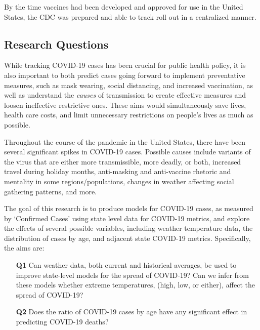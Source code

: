 \documentclass[11pt]{article}
\begin{document}
	By the time vaccines had been developed and approved for use in the United States, the CDC was prepared and able to track roll out in a centralized manner. 
	

\subsection{Research Questions}

While tracking COVID-19 cases has been crucial for public health policy, it is also important to both predict cases going forward to implement preventative measures, such as mask wearing, social distancing, and increased vaccination, as well as understand the \textit{causes} of transmission to create effective measures and loosen ineffective restrictive ones. These aims would simultaneously save lives, health care costs, and limit unnecessary restrictions on people's lives as much as possible. 

Throughout the course of the pandemic in the United States, there have been several significant spikes in COVID-19 cases. Possible causes include variants of the virus that are either more transmissible, more deadly, or both, increased travel during holiday months, anti-masking and anti-vaccine rhetoric and mentality in some regions/populations, changes in weather affecting social gathering patterns, and more. 

The goal of this research is to produce models for COVID-19 cases, as measured by `Confirmed Cases' using state level data for COVID-19 metrics, and explore the effects of several possible variables, including weather temperature data,  the distribution of cases by age, and adjacent state COVID-19 metrics.  Specifically, the aims are: 
\begin{enumerate}
\item[\bf Q1] Can weather data, both current and historical averages, be used to improve state-level models for the spread of COVID-19? Can we infer from these models whether extreme temperatures, (high, low, or either), affect the spread of COVID-19? 
\item[\bf Q2] Does the ratio of COVID-19 cases by age have any significant effect in predicting COVID-19 deaths?
\end{enumerate}
\end{document}
